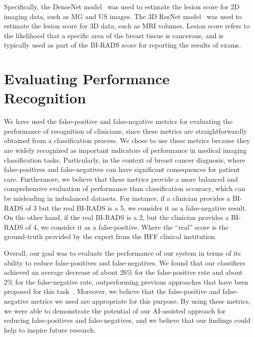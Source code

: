 Specifically, the DenseNet model~\cite{8721151} was used to estimate the lesion score for 2D imaging data, such as \ac{MG} and \ac{US} images.
The 3D ResNet model~\cite{Aldoj2020} was used to estimate the lesion score for 3D data, such as \ac{MRI} volumes.
Lesion score refers to the likelihood that a specific area of the breast tissue is cancerous, and is typically used as part of the \ac{BI-RADS} score for reporting the results of exams.

\section{Evaluating Performance Recognition}
\label{sec:app001005}

We have used the false-positive and false-negative metrics for evaluating the performance of recognition of clinicians, since these metrics are straightforwardly obtained from a classification process.
We chose to use these metrics because they are widely recognized as important indicators of performance in medical imaging classification tasks.
Particularly, in the context of breast cancer diagnosis, where false-positives and false-negatives can have significant consequences for patient care.
Furthermore, we believe that these metrics provide a more balanced and comprehensive evaluation of performance than classification accuracy, which can be misleading in imbalanced datasets.
For instance, if a clinician provides a \ac{BI-RADS} of 3 but the real \ac{BI-RADS} is a 5, we consider it as a false-negative result.
On the other hand, if the real \ac{BI-RADS} is a 2, but the clinician provides a \ac{BI-RADS} of 4, we consider it as a false-positive.
Where the ``real'' score is the ground-truth provided by the expert from the \ac{HFF} clinical institution.

Overall, our goal was to evaluate the performance of our system in terms of its ability to reduce false-positives and false-negatives.
We found that our classifiers achieved an average decrease of about 26\% for the false-positive rate and about 2\% for the false-negative rate, outperforming previous approaches that have been proposed for this task~\cite{CALISTO2022102285}.
Moreover, we believe that the false-positive and false-negative metrics we used are appropriate for this purpose.
By using these metrics, we were able to demonstrate the potential of our \ac{AI}-assisted approach for reducing false-positives and false-negatives, and we believe that our findings could help to inspire future research.

